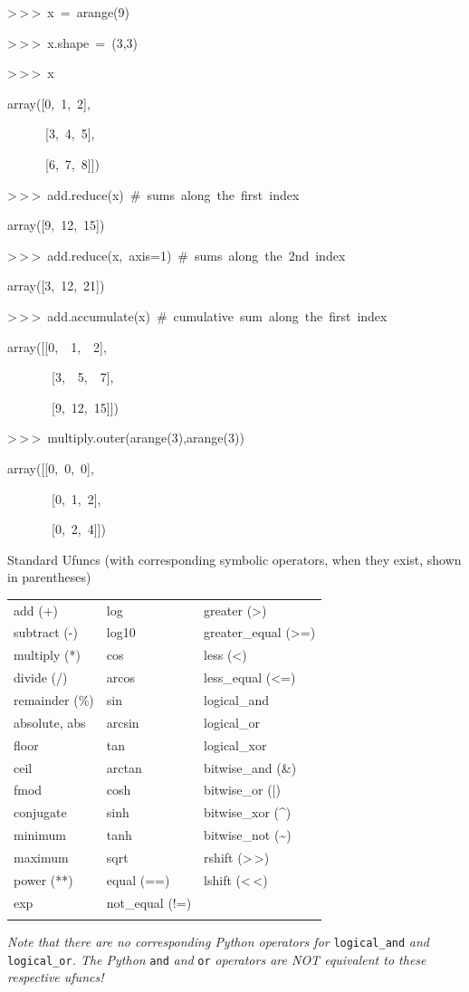 \begin{lyxcode}
>\,{}>\,{}>~x~=~arange(9)

>\,{}>\,{}>~x.shape~=~(3,3)

>\,{}>\,{}>~x

array({[}0,~1,~2],

~~~~~~{[}3,~4,~5],

~~~~~~{[}6,~7,~8]])

>\,{}>\,{}>~add.reduce(x)~\#~sums~along~the~first~index

array({[}9,~12,~15])

>\,{}>\,{}>~add.reduce(x,~axis=1)~\#~sums~along~the~2nd~index

array({[}3,~12,~21])

>\,{}>\,{}>~add.accumulate(x)~\#~cumulative~sum~along~the~first~index

array({[}{[}0,~~1,~~2],

~~~~~~~{[}3,~~5,~~7],

~~~~~~~{[}9,~12,~15]])

>\,{}>\,{}>~multiply.outer(arange(3),arange(3))

array({[}{[}0,~0,~0],

~~~~~~~{[}0,~1,~2],

~~~~~~~{[}0,~2,~4]])
\end{lyxcode}
Standard Ufuncs (with corresponding symbolic operators, when they
exist, shown in parentheses)

\begin{tabular}{lll}
add (+) & log & greater (>)\tabularnewline
subtract (-) & log10 & greater\_equal (>=)\tabularnewline
multiply ({*}) & cos & less (<)\tabularnewline
divide (/) & arcos & less\_equal (<=)\tabularnewline
remainder (\%) & sin & logical\_and\tabularnewline
absolute, abs & arcsin & logical\_or\tabularnewline
floor & tan & logical\_xor\tabularnewline
ceil & arctan & bitwise\_and (\&)\tabularnewline
fmod & cosh & bitwise\_or (|)\tabularnewline
conjugate & sinh & bitwise\_xor (\textasciicircum{})\tabularnewline
minimum & tanh & bitwise\_not (\textasciitilde{})\tabularnewline
maximum & sqrt & rshift (>\,{}>)\tabularnewline
power ({*}{*}) & equal (==) & lshift (<\,{}<)\tabularnewline
exp & not\_equal (!=) & \tabularnewline
 &  & \tabularnewline
\end{tabular}

\emph{Note that there are no corresponding Python operators for} \texttt{logical\_and}
\emph{and} \texttt{logical\_or}\emph{. The Python} \texttt{and} \emph{and}
\texttt{or} \emph{operators are NOT equivalent to these respective
ufuncs!}



